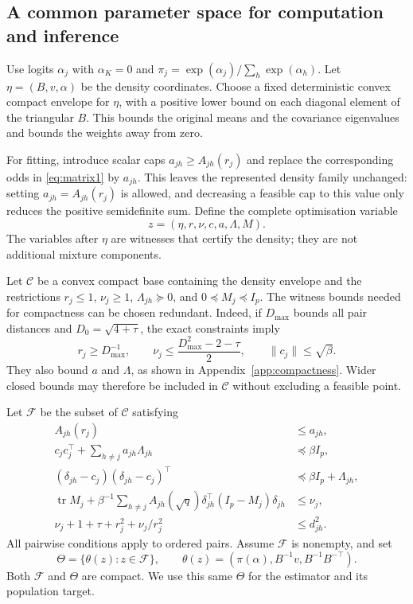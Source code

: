 \documentclass[12pt,a4paper]{article}
\theoremstyle{remark}
\DeclareMathOperator{\tr}{tr}
\begin{document}
\subsection{A common parameter space for computation and inference}

Use logits $\alpha_j$ with $\alpha_K=0$ and
$\pi_j=\exp(\alpha_j)/\sum_h\exp(\alpha_h)$. Let
$\eta=(B,v,\alpha)$ be the density coordinates. Choose a fixed deterministic convex compact envelope for $\eta$, with a positive lower bound on each diagonal element of the triangular $B$. This bounds the original means and the covariance eigenvalues and bounds the weights away from zero.

For fitting, introduce scalar caps $a_{jh}\ge A_{jh}(r_j)$ and replace the corresponding odds in \eqref{eq:matrix1} by $a_{jh}$. This leaves the represented density family unchanged: setting $a_{jh}=A_{jh}(r_j)$ is allowed, and decreasing a feasible cap to this value only reduces the positive semidefinite sum. Define the complete optimisation variable
\[
 z=(\eta,r,\nu,c,a,\Lambda,M).
\]
The variables after $\eta$ are witnesses that certify the density; they are not additional mixture components.

Let $\mathcal C$ be a convex compact base containing the density envelope and the restrictions $r_j\le1$, $\nu_j\ge1$, $\Lambda_{jh}\succeq0$, and $0\preceq M_j\preceq I_p$. The witness bounds needed for compactness can be chosen redundant. Indeed, if $D_{\max}$ bounds all pair distances and $D_0=\sqrt{4+\tau}$, the exact constraints imply
\begin{equation}\label{eq:witnessbounds}
 r_j\ge D_{\max}^{-1},\qquad
 \nu_j\le\frac{D_{\max}^2-2-\tau}{2},\qquad
 \|c_j\|\le\sqrt\beta.
\end{equation}
They also bound $a$ and $\Lambda$, as shown in Appendix~\ref{app:compactness}. Wider closed bounds may therefore be included in $\mathcal C$ without excluding a feasible point.

Let $\mathcal F$ be the subset of $\mathcal C$ satisfying
\begin{equation}\label{eq:exactlift}
\begin{aligned}
 A_{jh}(r_j)&\le a_{jh},\\
 c_jc_j^\top+\sum_{h\ne j}a_{jh}\Lambda_{jh}&\preceq\beta I_p,\\
 (\delta_{jh}-c_j)(\delta_{jh}-c_j)^\top&\preceq\beta I_p+\Lambda_{jh},\\
 \tr M_j+\beta^{-1}\sum_{h\ne j}A_{jh}(\sqrt q)
       \delta_{jh}^\top(I_p-M_j)\delta_{jh}&\le\nu_j,\\
 \nu_j+1+\tau+r_j^2+\nu_j/r_j^2&\le d_{jh}^2.
\end{aligned}
\end{equation}
All pairwise conditions apply to ordered pairs. Assume $\mathcal F$ is nonempty, and set
\[
 \Theta=\{\theta(z):z\in\mathcal F\},\qquad
 \theta(z)=\left(\pi(\alpha),B^{-1}v,B^{-1}B^{-\top}\right).
\]
Both $\mathcal F$ and $\Theta$ are compact. We use this same $\Theta$ for the estimator and its population target.
\end{document}

